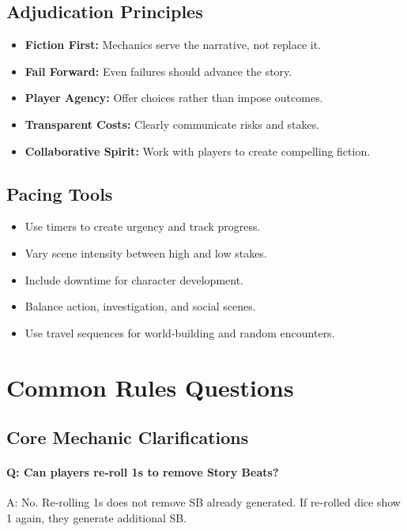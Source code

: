 \subsection{Adjudication Principles}\label{subsec:adjudication_ref}
\begin{itemize}
    \item \textbf{Fiction First:} Mechanics serve the narrative, not replace it.
    \item \textbf{Fail Forward:} Even failures should advance the story.
    \item \textbf{Player Agency:} Offer choices rather than impose outcomes.
    \item \textbf{Transparent Costs:} Clearly communicate risks and stakes.
    \item \textbf{Collaborative Spirit:} Work with players to create compelling fiction.
\end{itemize}

\subsection{Pacing Tools}\label{subsec:pacing_tools_ref}
\begin{itemize}
    \item Use timers to create urgency and track progress.
    \item Vary scene intensity between high and low stakes.
    \item Include downtime for character development.
    \item Balance action, investigation, and social scenes.
    \item Use travel sequences for world‑building and random encounters.
\end{itemize}

\newpage
\section{Common Rules Questions}\label{sec:rules_questions}

\subsection{Core Mechanic Clarifications}\label{subsec:core_clarifications}
\paragraph{Q: Can players re‑roll 1s to remove Story Beats?}
A: No. Re‑rolling 1s does not remove SB already generated. If re‑rolled dice show 1 again, they generate additional SB.

